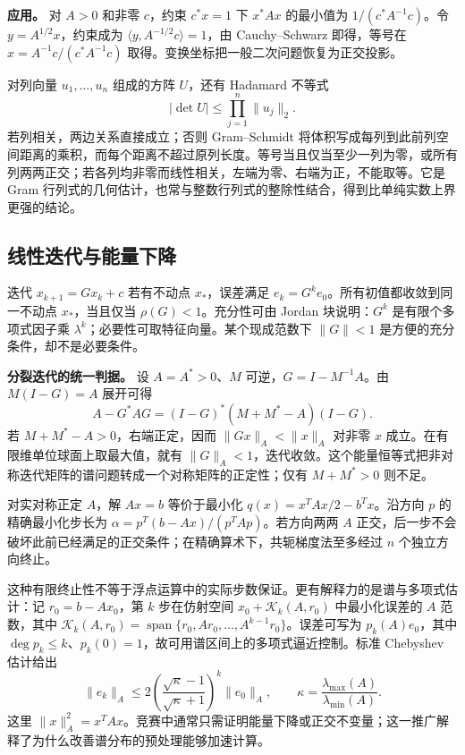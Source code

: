 \documentclass[12pt,fontset=fandol]{ctexart}
\begin{document}
\textbf{应用。} 对 $A>0$ 和非零 $c$，约束 $c^*x=1$ 下 $x^*Ax$ 的最小值为 $1/(c^*A^{-1}c)$。令 $y=A^{1/2}x$，约束成为 $\langle y,A^{-1/2}c\rangle=1$，由 Cauchy--Schwarz 即得，等号在 $x=A^{-1}c/(c^*A^{-1}c)$ 取得。变换坐标把一般二次问题恢复为正交投影。

对列向量 $u_1,\ldots,u_n$ 组成的方阵 $U$，还有 Hadamard 不等式
\[
|\det U|\leq\prod_{j=1}^n\|u_j\|_2.
\]
若列相关，两边关系直接成立；否则 Gram--Schmidt 将体积写成每列到此前列空间距离的乘积，而每个距离不超过原列长度。等号当且仅当至少一列为零，或所有列两两正交；若各列均非零而线性相关，左端为零、右端为正，不能取等。它是 Gram 行列式的几何估计，也常与整数行列式的整除性结合，得到比单纯实数上界更强的结论。

\subsection{线性迭代与能量下降}

\label{app:linear-iteration}

迭代 $x_{k+1}=Gx_k+c$ 若有不动点 $x_*$，误差满足 $e_k=G^ke_0$。所有初值都收敛到同一不动点 $x_*$，当且仅当 $\rho(G)<1$。充分性可由 Jordan 块说明：$G^k$ 是有限个多项式因子乘 $\lambda^k$；必要性可取特征向量。某个现成范数下 $\|G\|<1$ 是方便的充分条件，却不是必要条件。

\textbf{分裂迭代的统一判据。} 设 $A=A^*>0$、$M$ 可逆，$G=I-M^{-1}A$。由 $M(I-G)=A$ 展开可得
\[
A-G^*AG=(I-G)^*(M+M^*-A)(I-G).
\]
若 $M+M^*-A>0$，右端正定，因而 $\|Gx\|_A<\|x\|_A$ 对非零 $x$ 成立。在有限维单位球面上取最大值，就有 $\|G\|_A<1$，迭代收敛。这个能量恒等式把非对称迭代矩阵的谱问题转成一个对称矩阵的正定性；仅有 $M+M^*>0$ 则不足。

对实对称正定 $A$，解 $Ax=b$ 等价于最小化 $q(x)=x^TAx/2-b^Tx$。沿方向 $p$ 的精确最小化步长为 $\alpha=p^T(b-Ax)/(p^TAp)$。若方向两两 $A$ 正交，后一步不会破坏此前已经满足的正交条件；在精确算术下，共轭梯度法至多经过 $n$ 个独立方向终止。

这种有限终止性不等于浮点运算中的实际步数保证。更有解释力的是谱与多项式估计：记 $r_0=b-Ax_0$，第 $k$ 步在仿射空间 $x_0+\mathcal K_k(A,r_0)$ 中最小化误差的 $A$ 范数，其中 $\mathcal K_k(A,r_0)=\operatorname{span}\{r_0,Ar_0,\ldots,A^{k-1}r_0\}$。误差可写为 $p_k(A)e_0$，其中 $\deg p_k\leq k$、$p_k(0)=1$，故可用谱区间上的多项式逼近控制。标准 Chebyshev 估计给出
\[
\|e_k\|_A\leq2\left(\frac{\sqrt\kappa-1}{\sqrt\kappa+1}\right)^k\|e_0\|_A,
\qquad\kappa=\frac{\lambda_{\max}(A)}{\lambda_{\min}(A)}.
\]
这里 $\|x\|_A^2=x^TAx$。竞赛中通常只需证明能量下降或正交不变量；这一推广解释了为什么改善谱分布的预处理能够加速计算。
\end{document}
